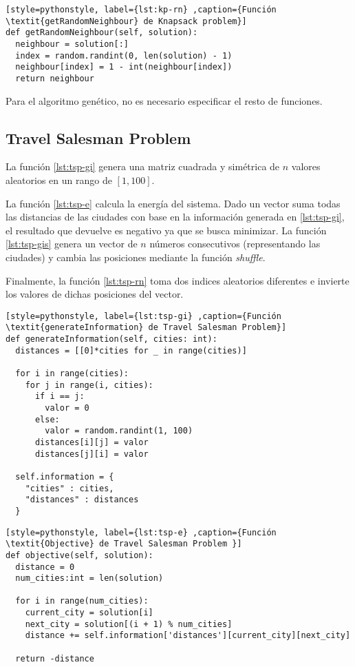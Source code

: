 \begin{lstlisting}[style=pythonstyle, label={lst:kp-rn} ,caption={Función \textit{getRandomNeighbour} de Knapsack problem}]
def getRandomNeighbour(self, solution):
  neighbour = solution[:]
  index = random.randint(0, len(solution) - 1)
  neighbour[index] = 1 - int(neighbour[index])
  return neighbour  
\end{lstlisting}

Para el algoritmo genético, no es necesario especificar el resto de funciones.

\subsection{Travel Salesman Problem}

La función \ref{lst:tsp-gi} genera una matriz cuadrada y simétrica de $n$ valores aleatorios en un rango de $[1, 100]$.

La función \ref{lst:tsp-e} calcula la energía del sistema. Dado un vector suma todas las distancias de las ciudades con base en la información generada en \ref{lst:tsp-gi}, el resultado que devuelve es negativo ya que se busca minimizar. La función \ref{lst:tsp-gis} genera un vector de $n$ números consecutivos (representando las ciudades) y cambia las posiciones mediante la función \textit{shuffle}.

Finalmente, la función \ref{lst:tsp-rn} toma dos indices aleatorios diferentes e invierte los valores de dichas posiciones del vector.

\begin{lstlisting}[style=pythonstyle, label={lst:tsp-gi} ,caption={Función \textit{generateInformation} de Travel Salesman Problem}]
def generateInformation(self, cities: int):
  distances = [[0]*cities for _ in range(cities)]

  for i in range(cities):
    for j in range(i, cities):  
      if i == j:
        valor = 0  
      else:
        valor = random.randint(1, 100)
      distances[i][j] = valor
  	  distances[j][i] = valor 

  self.information = {
	"cities" : cities,
	"distances" : distances
  }
\end{lstlisting}

\begin{lstlisting}[style=pythonstyle, label={lst:tsp-e} ,caption={Función \textit{Objective} de Travel Salesman Problem }]
def objective(self, solution):
  distance = 0
  num_cities:int = len(solution)

  for i in range(num_cities):
    current_city = solution[i]
    next_city = solution[(i + 1) % num_cities]  
    distance += self.information['distances'][current_city][next_city]

  return -distance
\end{lstlisting}

